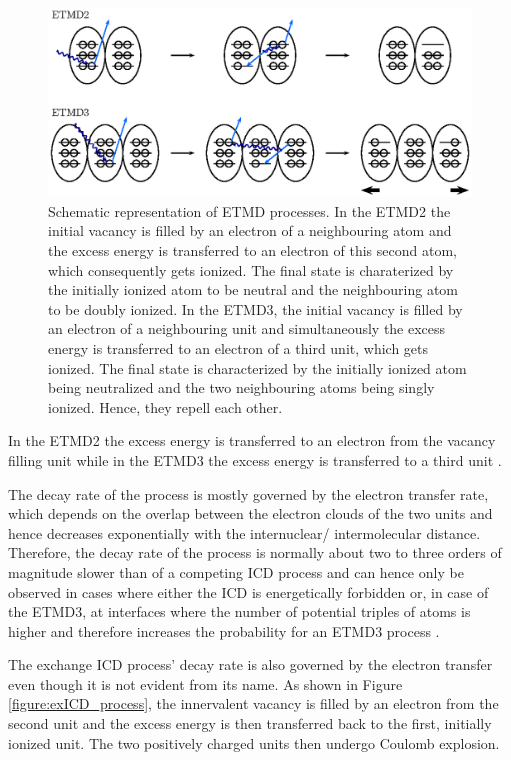 \begin{figure}[h]
 \centering
 \includegraphics{pics/etmd-pspic.eps}
 \caption{Schematic representation of \ac{ETMD} processes. In the ETMD2 the initial
          vacancy is filled by an electron of a neighbouring atom and the excess
          energy is transferred to an electron of this second atom, which
          consequently gets ionized. The final state is charaterized by the initially
          ionized atom to be neutral and the neighbouring atom to be doubly ionized.
          In the \ac{ETMD}3, the initial vacancy is filled by an electron of a
          neighbouring unit and simultaneously the excess energy is transferred to
          an electron of a third unit, which gets ionized. The final state is
          characterized by the initially ionized atom being neutralized and the
          two neighbouring atoms being singly ionized. Hence, they repell each other.}
 \label{figure:etmd_processes}
\end{figure}

In the ETMD2 \cite{Zobeley01} the excess energy is transferred to an electron
from the vacancy filling unit while in the ETMD3 the excess energy is transferred
to a third unit \cite{Zobeley98}.

The decay rate of the process is mostly governed by the electron transfer rate, which
depends on the overlap between the electron clouds of the two units and hence
decreases exponentially with the internuclear/ intermolecular distance. Therefore,
the decay rate of the process is normally about two to three orders of magnitude slower
than of a competing ICD process and can hence only be observed in cases where either
the ICD is energetically forbidden or, in case of the ETMD3, at interfaces
where the number of potential
triples of atoms is higher and therefore increases the probability for an ETMD3 process
\cite{Fasshauer13}.

The exchange ICD process' decay rate is also governed by the electron transfer
even though it is not evident from its name. As shown in
Figure \ref{figure:exICD_process}, the innervalent vacancy is filled by an electron
from the second unit and the excess energy is then transferred back to the first,
initially ionized unit. The two positively charged units then undergo Coulomb
explosion.

